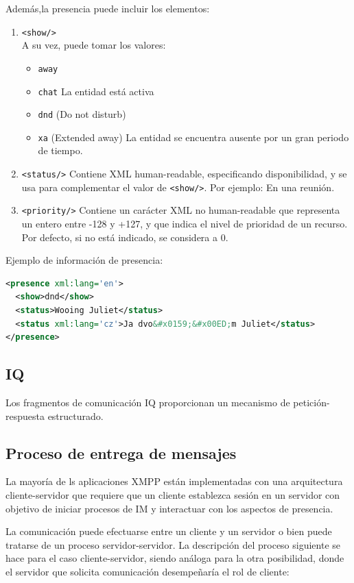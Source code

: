 \documentclass[a4paper, 11pt]{article} %
\begin{document}
    Además,la presencia puede incluir los elementos:
    \begin{enumerate}
     \item \texttt{<show/>}\\
     A su vez, puede tomar los valores:
     \begin{itemize}
      \item \texttt{away} 
      \item \texttt{chat} La entidad está activa
      \item \texttt{dnd} (Do not disturb)
      \item \texttt{xa} (Extended away) La entidad se encuentra ausente por un gran periodo de tiempo.
     \end{itemize}
     \item \texttt{<status/>}
     Contiene XML human-readable, especificando disponibilidad, y se usa para complementar el valor de \texttt{<show/>}.
     Por ejemplo: En una reunión.
     \item \texttt{<priority/>}
     Contiene un carácter XML no human-readable que representa un entero entre -128 y +127, y que indica el nivel
     de prioridad de un recurso. Por defecto, si no está indicado, se considera a 0.
    \end{enumerate}

    Ejemplo de información de presencia:
\begin{lstlisting}[language=XML]
<presence xml:lang='en'>
  <show>dnd</show>
  <status>Wooing Juliet</status>
  <status xml:lang='cz'>Ja dvo&#x0159;&#x00ED;m Juliet</status>
</presence>
\end{lstlisting}
  \subsection{IQ}
    Los fragmentos de comunicación IQ proporcionan un mecanismo de petición-respuesta estructurado.
  
  \subsection{Proceso de entrega de mensajes}
    La mayoría de ls aplicaciones XMPP están implementadas con una arquitectura cliente-servidor que requiere que un cliente
    establezca sesión en un servidor con objetivo de iniciar procesos de IM y interactuar con los aspectos de presencia.
    
    La comunicación puede efectuarse entre un cliente y un servidor o  bien puede tratarse de un proceso servidor-servidor.
    La descripción del proceso siguiente se hace para el caso cliente-servidor, siendo análoga para la otra posibilidad, 
    donde el servidor que solicita comunicación desempeñaría el rol de cliente:
  
\end{document}
